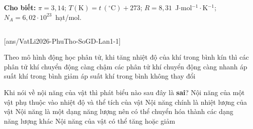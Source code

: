 \def\CheDo{solcolor}%
\def\tenchuong{Sở GD\&ĐT Phú Thọ -- Lần 1}
\def\thuonghieu{VẬT LÍ 12 -- Eduzy.com.vn}
\def\TachCauDS{1}
\def\TachCauLG{1}




	\noindent\textbf{Cho biết:} $\pi=3{,}14$; $T(\text{K})=t\,(^\circ\text{C})+273$; $R=8{,}31$~J$\cdot$mol$^{-1}\cdot$K$^{-1}$; $N_A=6{,}02\cdot 10^{23}$~hạt/mol.

	\noindent
	\subsection*{}
	\setcounter{ex}{0}
	[ans/VatLi2026-PhuTho-SoGD-Lan1-1]

	\begin{ex}%
		Theo mô hình động học phân tử, khi tăng nhiệt độ của khí trong bình kín thì
		\choice
		{các phân tử khí chuyển động càng chậm}
		{\True các phân tử khí chuyển động càng nhanh}
		{áp suất khí trong bình giảm}
		{áp suất khí trong bình không thay đổi}
	\end{ex}

	\begin{ex}%
		Khi nói về nội năng của vật thì phát biểu nào sau đây là \textbf{sai}?
		\choice
		{Nội năng của một vật phụ thuộc vào nhiệt độ và thể tích của vật}
		{\True Nội năng chính là nhiệt lượng của vật}
		{Nội năng là một dạng năng lượng nên có thể chuyển hóa thành các dạng năng lượng khác}
		{Nội năng của vật có thể tăng hoặc giảm}
	\end{ex}


